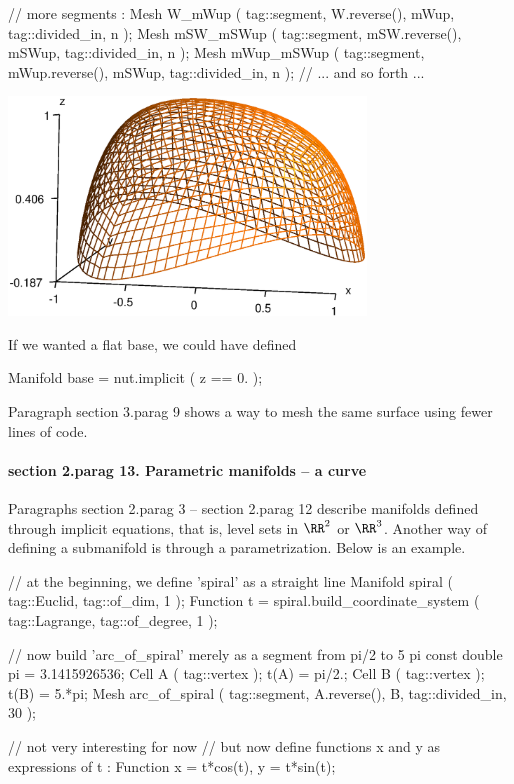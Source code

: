    // more segments :
   Mesh W_mWup ( tag::segment, W.reverse(), mWup, tag::divided_in, n );
   Mesh mSW_mSWup ( tag::segment, mSW.reverse(), mSWup, tag::divided_in, n );
   Mesh mWup_mSWup ( tag::segment, mWup.reverse(), mSWup, tag::divided_in, n );
   // ... and so forth ...
\endverbatim

\centerline{\includegraphics[width=95mm]{bumpy.eps}}

If we wanted a flat base, we could have defined

\verbatim
   Manifold base = nut.implicit ( z == 0. );
\endverbatim

Paragraph \numb section 3.\numb parag 9 shows a way to mesh the same surface using
fewer lines of code.


\paragraph{\numb section 2.\numb parag 13. Parametric manifolds -- a curve}

Paragraphs \numb section 2.\numb parag 3 -- \numb section 2.\numb parag 12 describe manifolds
defined through implicit equations, that is, level sets in $ \RR^2 $ or $ \RR^3 $.
Another way of defining a submanifold is through a parametrization.
Below is an example.

\verbatim
   // at the beginning, we define 'spiral' as a straight line
   Manifold spiral ( tag::Euclid, tag::of_dim, 1 );
   Function t = spiral.build_coordinate_system ( tag::Lagrange, tag::of_degree, 1 );

   // now build 'arc_of_spiral' merely as a segment from pi/2 to 5 pi
   const double pi = 3.1415926536;
   Cell A ( tag::vertex );  t(A) =  pi/2.;
   Cell B ( tag::vertex );  t(B) =  5.*pi;
   Mesh arc_of_spiral ( tag::segment, A.reverse(), B, tag::divided_in, 30 );

   // not very interesting for now
   // but now define functions x and y as expressions of t :
   Function x = t*cos(t), y = t*sin(t);

